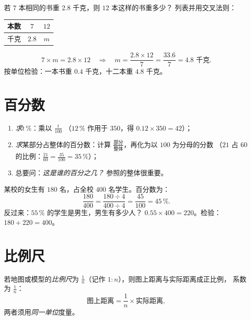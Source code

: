 \begin{example}[求第四个比例项]\label{ex:g7:prop:fourth}
若 $7$ 本相同的书重 $2.8$ 千克，则 $12$ 本这样的书重多少？
列表并用交叉法则：
\begin{center}
\renewcommand{\arraystretch}{1.3}
\begin{tabular}{l|cc}
本数 & $7$ & $12$ \\
\hline
千克 & $2.8$ & $m$ \\
\end{tabular}
\end{center}
\[
7 \times m = 2.8 \times 12
\quad\Longrightarrow\quad
m = \frac{2.8 \times 12}{7} = \frac{33.6}{7} = 4.8 \text{ 千克}.
\]
按单位检验：一本书重 $0.4$ 千克，十二本重 $4.8$ 千克。
\end{example}

\section{百分数}

\begin{method}[百分数的应用与求法]\label{met:g7:prop:percent}
\begin{enumerate}
  \item \emph{求}$t\,\%$：乘以 $\frac{t}{100}$
        （$12\,\%$ 作用于 $350$，得 $0.12 \times 350 = 42$）；
  \item \emph{求}某部分占整体的百分数：计算
        $\frac{\text{部分}}{\text{整体}}$，再化为以 $100$ 为分母的分数
        （$21$ 占 $60$ 的比例：$\frac{21}{60} = \frac{35}{100} = 35\,\%$）；
  \item 总要问：\emph{这是谁的百分之几？}
        参照的整体很重要。
\end{enumerate}
\end{method}

\begin{example}\label{ex:g7:prop:percent}
某校的女生有 $180$ 名，占全校 $400$ 名学生。百分数为：
\[
\frac{180}{400} = \frac{180 \div 4}{400 \div 4} = \frac{45}{100}
= 45\,\% .
\]
反过来：$55\,\%$ 的学生是男生，男生有多少人？
$0.55 \times 400 = 220$。检验：$180 + 220 = 400$。
\end{example}

\section{比例尺}

\begin{definition}[比例尺]\label{def:g7:prop:scale}
若地图或模型的\emph{比例尺}为
$\frac{1}{n}$（记作 $1 : n$），则图上距离与实际距离成正比例，
系数为 $\frac1n$：
\[
\text{图上距离} = \frac{1}{n} \times \text{实际距离},
\]
两者须用\emph{同一单位}度量。
\end{definition}

